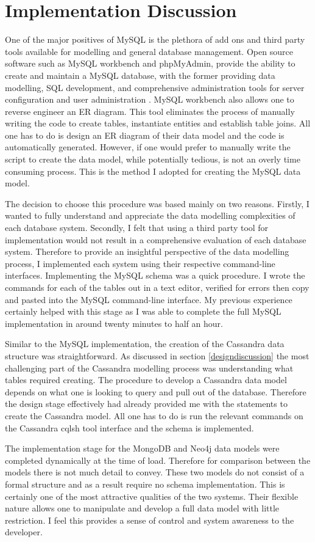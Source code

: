 \section{Implementation Discussion}\label{schemadiscussion}
One of the major positives of MySQL is the plethora of add ons and third party tools available for modelling and general database management. Open source software such as MySQL workbench and phpMyAdmin, provide the ability to create and maintain a MySQL database, with the former providing data modelling, SQL development, and comprehensive administration tools for server configuration and user administration \cite{mysqlworkbench}. MySQL workbench also allows one to reverse engineer an ER diagram. This tool eliminates the process of manually writing the code to create tables, instantiate entities and establish table joins. All one has to do is design an ER diagram of their data model and the code is automatically generated. However, if one would prefer to manually write the script to create the data model, while potentially tedious, is not an overly time consuming process. This is the method I adopted for creating the MySQL data model.

The decision to choose this procedure was based mainly on two reasons. Firstly, I wanted to fully understand and appreciate the data modelling complexities of each database system. Secondly, I felt that using a third party tool for implementation would not result in a comprehensive evaluation of each database system. Therefore to provide an insightful perspective of the data modelling process, I implemented each system using their respective command-line interfaces. Implementing the MySQL schema was a quick procedure. I wrote the commands for each of the tables out in a text editor, verified for errors then copy and pasted into the MySQL command-line interface. My previous experience certainly helped with this stage as I was able to complete the full MySQL implementation in around twenty minutes to half an hour. 

Similar to the MySQL implementation, the creation of the Cassandra data structure was straightforward. As discussed in section \ref{designdiscussion} the most challenging part of the Cassandra modelling process was understanding what tables required creating. The procedure to develop a Cassandra data model depends on what one is looking to query and pull out of the database. Therefore the design stage effectively had already provided me with the statements to create the Cassandra model. All one has to do is run the relevant commands on the Cassandra cqlsh tool interface and the schema is implemented.

The implementation stage for the MongoDB and Neo4j data models were completed dynamically at the time of load. Therefore for comparison between the models there is not much detail to convey. These two models do not consist of a formal structure and as a result require no schema implementation. This is certainly one of the most attractive qualities of the two systems. Their flexible nature allows one to manipulate and develop a full data model with little restriction. I feel this provides a sense of control and system awareness to the developer.


